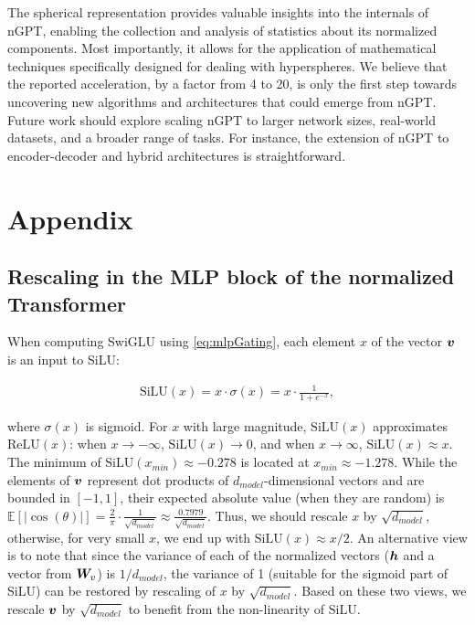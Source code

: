 \documentclass{article} %
\begin{document}
The spherical representation provides valuable insights into the internals of nGPT, enabling the collection and analysis of statistics about its normalized components. Most importantly, it allows for the application of mathematical techniques specifically designed for dealing with hyperspheres. We believe that the reported acceleration, by a factor from 4 to 20, is only the first step towards uncovering new algorithms and architectures that could emerge from nGPT. Future work should explore scaling nGPT to larger network sizes, real-world datasets, and a broader range of tasks.
For instance, the extension of nGPT to encoder-decoder and hybrid architectures \citep{dao2024transformers, de2024griffin} is straightforward. 




\clearpage
\appendix
\section{Appendix}

\subsection{Rescaling in the MLP block of the normalized Transformer}
\label{appendix:mlprescaling}

When computing SwiGLU using \eqref{eq:mlpGating}, each element $x$ of the vector ${\bm{v}}$ is an input to SiLU: 

\begin{align}
    \text{SiLU}(x) = x \cdot \sigma(x) = x \cdot \frac{1}{1 + e^{-x}}
, \label{eq:silu}
\end{align}

where $\sigma(x)$ is sigmoid. For $x$ with large magnitude, $\text{SiLU}(x)$ approximates $\text{ReLU}(x)$: when $x \to -\infty$, $\text{SiLU}(x) \to 0$, and when $x \to \infty$, $\text{SiLU}(x) \approx x$. The minimum of $\text{SiLU}(x_{min})\approx-0.278$ is located at $x_{min}\approx-1.278$. While the elements of ${\bm{v}}$ represent dot products of $d_{model}$-dimensional vectors and are bounded in $[-1,1]$,  their expected absolute value (when they are random) is $\mathbb{E}[|\cos(\theta)|] = \frac{2}{\pi} \cdot \frac{1}{\sqrt{d_{model}}}\approx\frac{0.7979}{\sqrt{d_{model}}}$. Thus, we should rescale $x$ by ${\sqrt{d_{model}}}$, otherwise, for very small $x$, we end up with $\text{SiLU}(x)\approx x/2$. An alternative view is to note that since the variance of each of the normalized vectors (${\bm{h}}$ and a vector from ${\bm{W}}_v$) is  ${1/d_{model}}$, the variance of 1 (suitable for the sigmoid part of SiLU) can be restored by rescaling of $x$ by ${\sqrt{d_{model}}}$. Based on these two views, we rescale ${\bm{v}}$ by $\sqrt{d_{model}}$ to benefit from the non-linearity of $\text{SiLU}$. 
\end{document}

